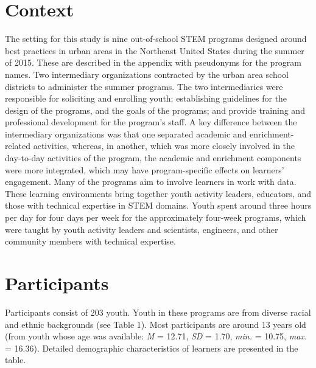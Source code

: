 \documentclass[]{msu-thesis}
\theoremstyle{definition}
\theoremstyle{definition}
\theoremstyle{definition}
\theoremstyle{remark}
\begin{document}
\section{Context}\label{context}

The setting for this study is nine out-of-school STEM programs designed
around best practices in urban areas in the Northeast United States
during the summer of 2015. These are described in the appendix with
pseudonyms for the program names. Two intermediary organizations
contracted by the urban area school districts to administer the summer
programs. The two intermediaries were responsible for soliciting and
enrolling youth; establishing guidelines for the design of the programs,
and the goals of the programs; and provide training and professional
development for the program's staff. A key difference between the
intermediary organizations was that one separated academic and
enrichment-related activities, whereas, in another, which was more
closely involved in the day-to-day activities of the program, the
academic and enrichment components were more integrated, which may have
program-specific effects on learners' engagement. Many of the programs
aim to involve learners in work with data. These learning environments
bring together youth activity leaders, educators, and those with
technical expertise in STEM domains. Youth spent around three hours per
day for four days per week for the approximately four-week programs,
which were taught by youth activity leaders and scientists, engineers,
and other community members with technical expertise.

\section{Participants}\label{participants}

Participants consist of 203 youth. Youth in these programs are from
diverse racial and ethnic backgrounds (see Table 1). Most participants
are around 13 years old (from youth whose age was available: \emph{M} =
12.71, \emph{SD} = 1.70, \emph{min.} = 10.75, \emph{max.} = 16.36).
Detailed demographic characteristics of learners are presented in the
table.
\end{document}
